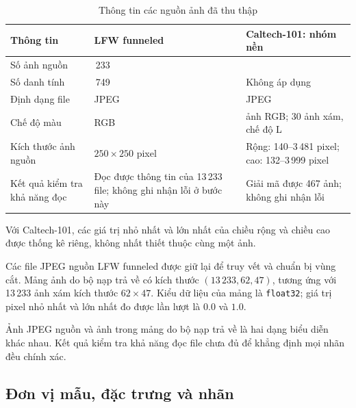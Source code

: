 \documentclass[12pt,a4paper,oneside]{report}
\begin{document}
\begin{table}[H]
    \centering
    \caption{Thông tin các nguồn ảnh đã thu thập}
    \label{tab:nguon_du_lieu}
    \small
    \begin{tabularx}{\textwidth}{
        >{\raggedright\arraybackslash}X
        >{\raggedright\arraybackslash}X
        >{\raggedright\arraybackslash}X}
        \toprule
        \textbf{Thông tin}
        & \textbf{LFW funneled}
        & \textbf{Caltech-101: nhóm nền} \\
        \midrule
        Số ảnh nguồn
        & 13\,233
        & 467 \\

        Số danh tính
        & 5\,749
        & Không áp dụng \\

        Định dạng file
        & JPEG
        & JPEG \\

        Chế độ màu
        & RGB
        & 437 ảnh RGB; 30 ảnh xám, chế độ L \\

        Kích thước ảnh nguồn
        & $250 \times 250$ pixel
        & Rộng: 140--3\,481 pixel;
          cao: 132--3\,999 pixel \\

        Kết quả kiểm tra khả năng đọc
        & Đọc được thông tin của 13\,233 file;
          không ghi nhận lỗi ở bước này
        & Giải mã được 467 ảnh;
          không ghi nhận lỗi \\

        \bottomrule
    \end{tabularx}
\end{table}

Với Caltech-101, các giá trị nhỏ nhất và lớn nhất
của chiều rộng và chiều cao được thống kê riêng,
không nhất thiết thuộc cùng một ảnh.

Các file JPEG nguồn LFW funneled được giữ lại
để truy vết và chuẩn bị vùng cắt.
Mảng ảnh do bộ nạp trả về có kích thước
$(13\,233, 62, 47)$, tương ứng với 13\,233 ảnh xám
kích thước $62 \times 47$.
Kiểu dữ liệu của mảng là \texttt{float32};
giá trị pixel nhỏ nhất và lớn nhất đo được
lần lượt là $0.0$ và $1.0$.

Ảnh JPEG nguồn và ảnh trong mảng do bộ nạp trả về
là hai dạng biểu diễn khác nhau.
Kết quả kiểm tra khả năng đọc file chưa đủ để
khẳng định mọi nhãn đều chính xác.

\subsection*{Đơn vị mẫu, đặc trưng và nhãn}
\end{document}
